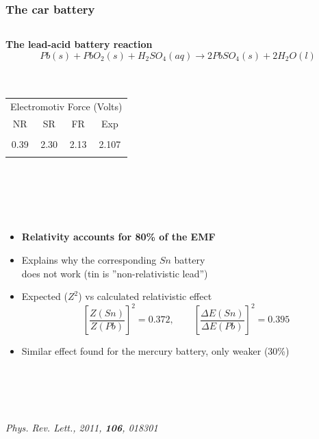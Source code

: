 \documentclass[mathserif,8pt]{beamer}
\begin{document}
\begin{frame}
    \frametitle{The car battery}
    \begin{columns}
    \begin{column}{.60\textwidth}
	    \textbf{The lead-acid battery reaction}
	    \begin{equation}
		\nonumber
		Pb(s) + PbO_2(s) + H_2SO_4(aq) \rightarrow
		    2PbSO_4(s) + 2H_2O(l)
	    \end{equation}
	    \ \\
	    \ \\
	    \begin{table}
		\centering
		\begin{tabular}{cccc}
		    \hline
		    \hline
		    \multicolumn{4}{c}{Electromotiv Force (Volts)}\\
		    NR  & SR & FR   & Exp   \\
		    \hline
			&    &      &       \\
		    0.39&2.30& 2.13 & 2.107 \\
			&    &      &       \\
		    \hline
		    \hline
		\end{tabular}
	    \end{table}
	    \ \\
	    \ \\
	    \ \\
	    \ \\
	\begin{itemize}
	    \item   \textbf{Relativity accounts for 80\% of the EMF}
	    \item   Explains why the corresponding $Sn$ battery\\ 
		    does not work (tin is ''non-relativistic lead'')
	    \item   Expected ($Z^2$) vs calculated relativistic effect
		    \begin{equation}
			\nonumber
			\left[\frac{Z(Sn)}{Z(Pb)}\right]^2 = 0.372, \qquad
			\left[\frac{\Delta E(Sn)}{\Delta E(Pb)}\right]^2 = 0.395
		    \end{equation}
	    \item   Similar effect found for the mercury battery, only weaker (30\%)\\
	\end{itemize}
	\ \\
	\ \\
	\ \\
	\ \\
	\scriptsize{\it{Phys. Rev. Lett.}, 2011, \textbf{106}, 018301}\\

\end{column}
\end{columns}
\end{frame}
\end{document}
